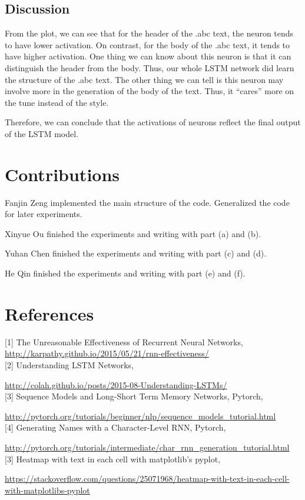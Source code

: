 \documentclass{article}
\begin{document}
\subsection{Discussion}
From the plot, we can see that for the header of the .abc text, the neuron tends to have lower activation. On contrast, for the body of the .abc text, it tends to have higher activation. One thing we can know about this neuron is that it can distinguish the header from the body. Thus, our whole LSTM network did learn the structure of the .abc text. The other thing we can tell is this neuron may involve more in the generation of the body of the text. Thus, it “cares” more on the tune instead of the style.

Therefore, we can conclude that the activations of neurons reflect the final output of the LSTM model.

\newpage
\section{Contributions}
Fanjin Zeng
implemented the main structure of the code. Generalized the code for later experiments.



Xinyue Ou
finished the experiments and writing with part (a) and (b).



Yuhan Chen
finished the experiments and writing with part (c) and (d).



He Qin
finished the experiments and writing with part (e) and (f).


\section{References}
[1] The Unreasonable Effectiveness of Recurrent Neural Networks, 
\url{http://karpathy.github.io/2015/05/21/rnn-effectiveness/} \\

[2] Understanding LSTM Networks, 

\url{http://colah.github.io/posts/2015-08-Understanding-LSTMs/}\\

[3] Sequence Models and Long-Short Term Memory Networks, Pytorch,
 
 \url{http://pytorch.org/tutorials/beginner/nlp/sequence_models_tutorial.html} \\

[4] Generating Names with a Character-Level RNN, Pytorch,
 
 \url{http://pytorch.org/tutorials/intermediate/char_rnn_generation_tutorial.html}  \\

[3] Heatmap with text in each cell with matplotlib's pyplot,

 \url{https://stackoverflow.com/questions/25071968/heatmap-with-text-in-each-cell-with-matplotlibs-pyplot}\\
\end{document}
